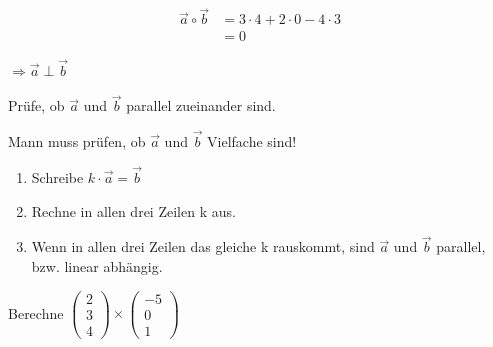 \documentclass[paper=a6,landscape,ngerman,twoside=true,fontsize=12pt]{scrartcl}
\begin{document}
\begin{antwort}
	\begin{align*}
	\vec{a} \circ \vec{b} &= 3 \cdot 4 + 2 \cdot 0 -4\cdot 3 \\
	&= 0
	\end{align*}
	
	$\Rightarrow \vec{a} \perp \vec{b}$
	
\end{antwort}	
\begin{frage}
	\LARGE
	Prüfe, ob $\vec{a}$ und  $\vec{b}$ 
	parallel zueinander sind.
\end{frage}
\begin{antwort}
	Mann muss prüfen, ob $\vec{a}$ und  $\vec{b}$ Vielfache sind!
	\begin{enumerate}
		\item Schreibe $k \cdot \vec{a}= \vec{b}$
		\item Rechne in allen drei Zeilen k aus.			
		\item Wenn in allen drei Zeilen das gleiche k rauskommt, sind $\vec{a}$ und $\vec{b}$ parallel, bzw. linear abhängig.	
	\end{enumerate}	
	
\end{antwort}	
\begin{frage}

	Berechne  $\left(\begin{array}{c} 2 \\ 3 \\ 4\end{array} \right) \times \left(\begin{array}{c} -5 \\ 0 \\ 1\end{array} \right)$ 
	
\end{frage}
\end{document}
